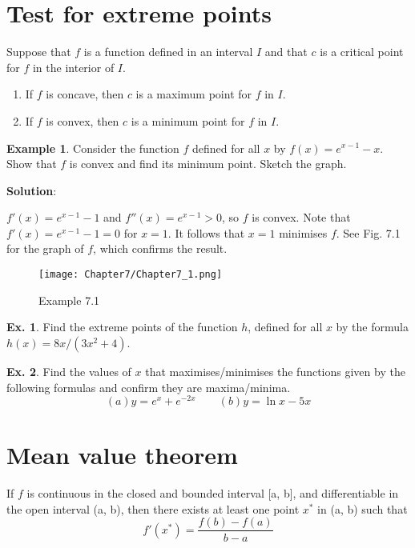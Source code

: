 \documentclass[10pt,a4paper]{book}
\theoremstyle{definition}\newtheorem{definition}{Definition}
\theoremstyle{definition}\newtheorem{fact}{Fact}
\theoremstyle{definition}\newtheorem{ex}{Ex.}
\theoremstyle{definition}\newtheorem{project}{Project}
\theoremstyle{definition}\newtheorem{problem}{Problem}
\theoremstyle{definition}\newtheorem{example}{Example}
\numberwithin{theorem}{chapter}
\numberwithin{corollary}{chapter}
\numberwithin{assumption}{chapter}
\numberwithin{definition}{chapter}
\numberwithin{prop}{chapter}
\numberwithin{notation}{chapter}
\numberwithin{problem}{chapter}
\numberwithin{example}{chapter}
\numberwithin{fact}{chapter}
\numberwithin{ex}{chapter}
\begin{document}
	\section{Test for extreme points}
	
	Suppose that $f$ is a function defined in an interval $I$ and that $c$ is a critical point for $f$ in the interior of $I$.
	\begin{enumerate}[label=(\alph*)]
		\item If $f$ is concave, then $c$ is a maximum point for $f$ in $I$.
		\item If $f$ is convex, then $c$ is a minimum point for $f$ in $I$.
	\end{enumerate}
	
	\begin{example}
		Consider the function $f$ defined for all $x$ by $f(x) = e^{x-1} - x$. Show that $f$ is convex and find its minimum point. Sketch the graph.
		
		\textbf{Solution}:
		
		$f'(x) = e^{x-1} - 1$ and $f''(x) = e^{x-1} > 0$, so $f$ is convex. Note that $f'(x) = e^{x-1}-1=0$ for $x=1$. It follows that $x=1$ minimises $f$. See Fig. 7.1 for the graph of $f$, which confirms the result.
		\begin{figure}[H]
			\centering
			\texttt{[image: Chapter7/Chapter7\_1.png]}
			\caption{Example 7.1}
		\end{figure}
	\end{example}
	
	\begin{ex}
		Find the extreme points of the function $h$, defined for all $x$ by the formula $h(x) = 8x/(3x^2+4)$.
	\end{ex}
	
	\begin{ex}
		Find the values of $x$ that maximises/minimises the functions given by the following formulas and confirm they are maxima/minima.
		\begin{equation*}
			(a) y = e^x + e^{-2x} \qquad
			(b) y = \ln x - 5x
		\end{equation*}
	\end{ex}
	
	\section{Mean value theorem}
	
	If $f$ is continuous in the closed and bounded interval [a, b], and differentiable in the open interval (a, b), then there exists at least one point $x^{*}$ in (a, b) such that
	$$f'(x^{*}) = \frac{f(b)-f(a)}{b-a}$$
	
\end{document}
